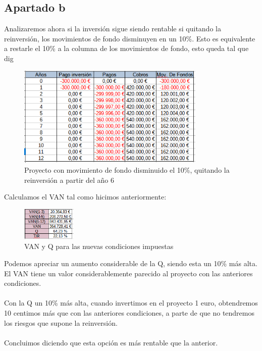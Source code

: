 \documentclass[11pt,letterpaper,onecolumn]{article}
\begin{document}
\subsection{Apartado b}
Analizaremos ahora si la inversión sigue siendo rentable si quitando la reinversión, los movimientos de fondo disminuyen en un 10\%. Esto es equivalente a restarle el 10\% a la columna de los movimientos de fondo, esto queda tal que
dig
\begin{figure}[H]
	\centering
	\includegraphics[width=0.8\textwidth]{imagen/ej3b.PNG}
	\caption{Proyecto con movimiento de fondo disminuido el 10\%, quitando la reinversión a partir del año 6}
	\label{fig:imagen-ej3b-PNG}
\end{figure}
Calculamos el VAN tal como hicimos anteriormente:
\begin{figure}[H]
	\centering
	\includegraphics[width=0.23\textwidth]{imagen/ej3b_van.PNG}
	\caption{VAN y Q para las nuevas condiciones impuestas}
	\label{fig:imagen-ej3b_van-PNG}
\end{figure}
Podemos apreciar un aumento considerable de la Q, siendo esta un 10\% más alta. El VAN tiene un valor considerablemente parecido al proyecto con las anteriores condiciones.\\
\\
Con la Q un 10\% más alta, cuando invertimos en el proyecto 1 euro, obtendremos 10 centimos más que con las anteriores condiciones, a parte de que no tendremos los riesgos que supone la reinversión.\\
\\
Concluimos diciendo que esta opción es más rentable que la anterior.
\end{document}
